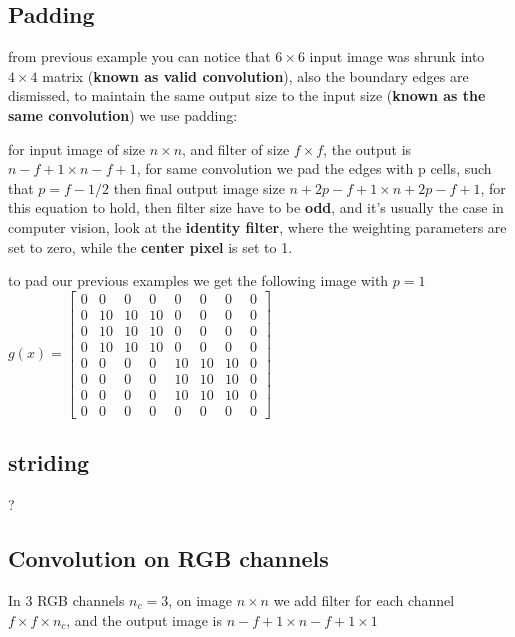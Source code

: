 \documentclass[4apaper,12pt]{book}
\begin{document}
\begin{description}
\begin{description}
        \subsection{Padding}
      \item from previous example you can notice that $6\times6$ input image was shrunk into $4\times4$ matrix (\textbf{known as valid convolution}), also the boundary edges are dismissed, to maintain the same output size to the input size (\textbf{known as the same convolution}) we use padding:
      \item for input image of size $n\times n$, and filter of size $f\times f$, the output is $n-f+1\times n-f+1$, for same convolution we pad the edges with p cells, such that $p=f-1/2$ then final output image size $n+2p-f+1\times n+2p-f+1$, for this equation to hold, then filter size have to be \textbf{odd}, and it's usually the case in computer vision, look at the \textbf{identity filter}, where the weighting parameters are set to zero, while the \textbf{center pixel} is set to 1.
      \item to pad our previous  examples we get the following image with $p=1$ $g(x)=\begin{bmatrix}
        0&0&0&0&0&0&0&0 \\
        0&10&10&10&0&0&0&0\\
        0&10&10&10&0&0&0&0\\
        0&10&10&10&0&0&0&0\\
        0&0&0&0&10&10&10&0\\
        0&0&0&0&10&10&10&0\\
        0&0&0&0&10&10&10&0\\
        0&0&0&0&0&0&0&0\end{bmatrix}$
        \subsection{striding}
        \item ?
    \end{description}
    \subsection{Convolution on RGB channels}
    \begin{description}
      \item In 3 RGB channels $n_c=3$, on image $n\times{n}$ we add filter for each channel $f\times{f}\times{n_c}$, and the output image is $n-f+1 \times{n-f+1} \times{1}$
    \end{description}

\end{description}
\end{document}
